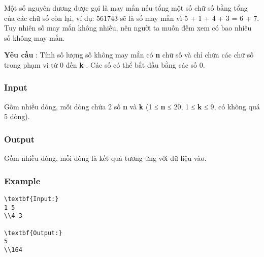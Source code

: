



   Một số nguyên dương được gọi là may mắn nếu tổng một số chữ số bằng tổng của các chữ số còn lại, ví dụ: 561743 sẽ là số may mắn vì 5 + 1 + 4 + 3 = 6 + 7. Tuy nhiên số may mắn không nhiều, nên người ta muốn đếm xem có bao nhiêu số không may mắn.  

\textbf{Yêu cầu}   : Tính số lượng số không may mắn có   \textbf{n}   chữ số và chỉ chứa các chữ số trong phạm vi từ 0 đến   \textbf{k}   . Các số có thể bắt đầu bằng các số 0.  

\subsubsection{   Input  }

   Gồm nhiều dòng, mỗi dòng chứa 2 số   \textbf{n}   và   \textbf{k}   (1 ≤   \textbf{n}   ≤ 20, 1 ≤   \textbf{k}   ≤ 9, có không quá 5 dòng).  

\subsubsection{   Output  }

   Gồm nhiều dòng, mỗi dòng là kết quả tương ứng với dữ liệu vào.  

\subsubsection{   Example  }
\begin{verbatim}
\textbf{Input:}
1 5
\\4 3

\textbf{Output:}
5
\\164 \end{verbatim}
